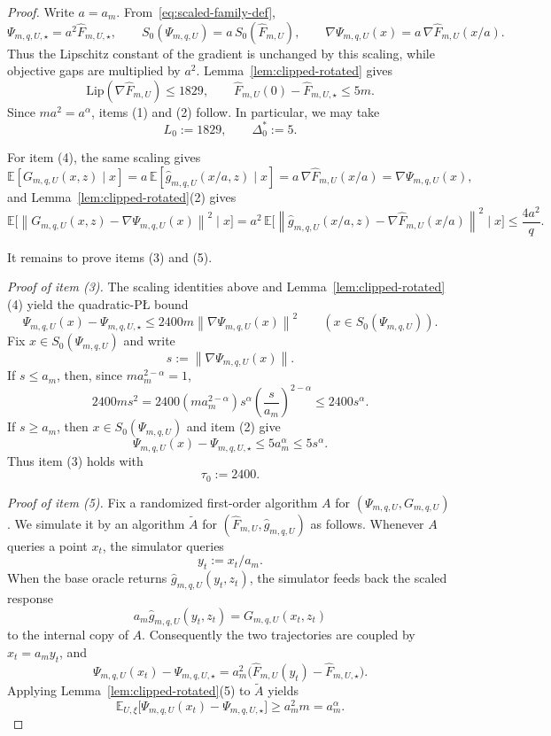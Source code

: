 \documentclass[11pt]{article}
\newcommand{\E}{\mathbb{E}}
\newcommand{\norm}[1]{\left\lVert #1\right\rVert}
\begin{document}
\begin{proof}
Write \(a=a_m\). From~\eqref{eq:scaled-family-def},
\[
\Psi_{m,q,U,\star}=a^2\widehat F_{m,U,\star},
\qquad
S_0(\Psi_{m,q,U})=a\,S_0(\widehat F_{m,U}),
\qquad
\nabla\Psi_{m,q,U}(x)=a\,\nabla\widehat F_{m,U}(x/a).
\]
Thus the Lipschitz constant of the gradient is unchanged by this scaling, while objective gaps are multiplied by
\(a^2\). Lemma~\ref{lem:clipped-rotated} gives
\[
\mathrm{Lip}(\nabla \widehat F_{m,U})\le 1829,
\qquad
\widehat F_{m,U}(0)-\widehat F_{m,U,\star}\le 5m.
\]
Since \(ma^2=a^\alpha\), items (1) and (2) follow.
In particular, we may take
\[
L_0:=1829,
\qquad
\Delta_0^\ast:=5.
\]

For item (4), the same scaling gives
\[
\E[G_{m,q,U}(x,z)\mid x]
=
a\,\E[\widehat g_{m,q,U}(x/a,z)\mid x]
=
a\,\nabla\widehat F_{m,U}(x/a)
=
\nabla\Psi_{m,q,U}(x),
\]
and Lemma~\ref{lem:clipped-rotated}(2) gives
\[
\E\bigl[\norm{G_{m,q,U}(x,z)-\nabla\Psi_{m,q,U}(x)}^2\mid x\bigr]
=
a^2\,\E\bigl[\norm{\widehat g_{m,q,U}(x/a,z)-\nabla\widehat F_{m,U}(x/a)}^2\mid x\bigr]
\le
\frac{4a^2}{q}.
\]

It remains to prove items (3) and (5).

\emph{Proof of item (3).}
The scaling identities above and Lemma~\ref{lem:clipped-rotated}(4) yield the quadratic-P\L{} bound
\[
\Psi_{m,q,U}(x)-\Psi_{m,q,U,\star}\le 2400m\norm{\nabla \Psi_{m,q,U}(x)}^2
\qquad
(x\in S_0(\Psi_{m,q,U})).
\]
Fix $x\in S_0(\Psi_{m,q,U})$ and write
\[
s:=\norm{\nabla \Psi_{m,q,U}(x)}.
\]
If $s\le a_m$, then, since $ma_m^{2-\alpha}=1$,
\[
2400ms^2
=
2400(ma_m^{2-\alpha})s^\alpha\left(\frac{s}{a_m}\right)^{2-\alpha}
\le
2400s^\alpha.
\]
If \(s\ge a_m\), then \(x\in S_0(\Psi_{m,q,U})\) and item (2) give
\[
\Psi_{m,q,U}(x)-\Psi_{m,q,U,\star}\le 5a_m^\alpha\le 5s^\alpha.
\]
Thus item (3) holds with
\[
\tau_0:=2400.
\]

\emph{Proof of item (5).}
Fix a randomized first-order algorithm $A$ for $(\Psi_{m,q,U},G_{m,q,U})$.
We simulate it by an algorithm $\widetilde A$ for $(\widehat F_{m,U},\widehat g_{m,q,U})$ as follows.
Whenever $A$ queries a point $x_t$, the simulator queries
\[
y_t:=x_t/a_m.
\]
When the base oracle returns $\widehat g_{m,q,U}(y_t,z_t)$, the simulator feeds back the scaled response
\[
a_m\widehat g_{m,q,U}(y_t,z_t)=G_{m,q,U}(x_t,z_t)
\]
to the internal copy of $A$.
Consequently the two trajectories are coupled by $x_t=a_my_t$, and
\[
\Psi_{m,q,U}(x_t)-\Psi_{m,q,U,\star}
=
a_m^2\bigl(\widehat F_{m,U}(y_t)-\widehat F_{m,U,\star}\bigr).
\]
Applying Lemma~\ref{lem:clipped-rotated}(5) to $\widetilde A$ yields
\[
\E_{U,\xi}\bigl[\Psi_{m,q,U}(x_t)-\Psi_{m,q,U,\star}\bigr]
\ge
a_m^2 m
=
a_m^\alpha.
\]
\end{proof}
\end{document}
